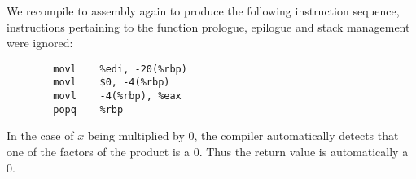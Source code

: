 \documentclass{article}
\begin{document}
\begin{enumerate}
    We recompile to assembly again to produce the following instruction sequence, instructions pertaining to
    the function prologue, epilogue and stack management were ignored:

    \begin{verbatim}
        movl	%edi, -20(%rbp)
        movl	$0, -4(%rbp)
        movl	-4(%rbp), %eax
        popq	%rbp
    \end{verbatim}

    In the case of \(x\) being multiplied by 0, the compiler automatically detects that one of the factors of the
    product is a 0. Thus the return value is automatically a 0.

\end{enumerate}
\end{document}
